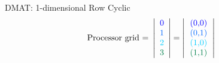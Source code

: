 \begin{frame}
\begin{exampleblock}{DMAT: 1-dimensional Row Cyclic}
\begin{align*}
\text{Processor grid = }\left|
      \begin{array}{l}
      \color{g11}0 \\
      \color{g12}1 \\
      \color{g13}2 \\
      \color{g21}3
      \end{array}
\right| &= 
\left|
      \begin{tabular}{lll}
      \color{g11}(0,0) \\
      \color{g12}(0,1) \\
      \color{g13}(1,0) \\
      \color{g21}(1,1) 
      \end{tabular}
\right|
\end{align*}
\end{exampleblock}
\end{frame}



